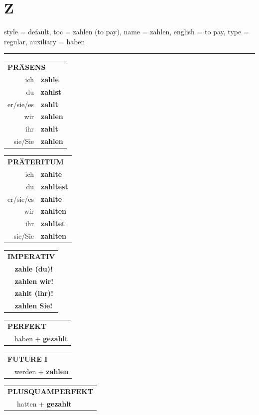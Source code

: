 \section{Z}

\begin{verbentry}{
  style = {default},
  toc = {zahlen (to pay)},
  name = {zahlen},
  english = {to pay},
  type = {regular},
  auxiliary = {haben}
}


\vspace{5pt}
\hrule
\vspace{5pt}

\begin{tabular}{rl}
\multicolumn{2}{l}{\textbf{PRÄSENS}}\\
ich & \textbf{zahle}\\
du & \textbf{zahlst}\\
er/sie/es & \textbf{zahlt}\\
wir & \textbf{zahlen}\\
ihr & \textbf{zahlt}\\
sie/Sie & \textbf{zahlen}\\
\end{tabular}
\hfill
\begin{tabular}{rl}
\multicolumn{2}{l}{\textbf{PRÄTERITUM}}\\
ich & \textbf{zahlte}\\
du & \textbf{zahltest}\\
er/sie/es & \textbf{zahlte}\\
wir & \textbf{zahlten}\\
ihr & \textbf{zahltet}\\
sie/Sie & \textbf{zahlten}\\
\end{tabular}
\hfill
\begin{tabular}{rl}
\multicolumn{2}{l}{\textbf{IMPERATIV}}\\
& \textbf{zahle (du)!}\\
& \textbf{zahlen wir!}\\
& \textbf{zahlt (ihr)!}\\
& \textbf{zahlen Sie!}\\
\end{tabular}

\vspace{10pt}

\begin{tabular}{rl}
\multicolumn{2}{l}{\textbf{PERFEKT}}\\
& haben + \textbf{gezahlt}\\
\end{tabular}
\hfill
\begin{tabular}{rl}
\multicolumn{2}{l}{\textbf{FUTURE I}}\\
& werden + \textbf{zahlen}\\
\end{tabular}
\hfill
\begin{tabular}{rl}
\multicolumn{2}{l}{\textbf{PLUSQUAMPERFEKT}}\\
& hatten + \textbf{gezahlt}\\
\end{tabular}


\end{verbentry}
